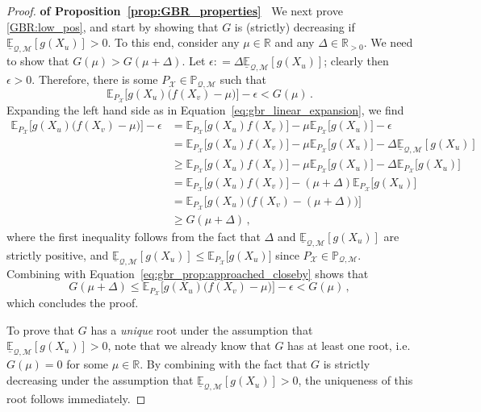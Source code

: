 \documentclass[3p]{elsarticle}
\newcommand{\reals}{\mathbb{R}}
\newcommand{\realspos}{\reals_{>0}}
\newcommand{\states}{\mathcal{X}}
\newcommand{\lexp}{\underline{\mathbb{E}}_{\rateset,\mathcal{M}}}
\newcommand{\rateset}{\mathcal{Q}}
\newcommand{\coloneqq}{:\!=}
\begin{document}
\begin{proof}{\bf of Proposition~\ref{prop:GBR_properties}~}
We next prove \ref{GBR:low_pos}, and start by showing that $G$ is (strictly) decreasing if $\lexp[g(X_u)]>0$. To this end, consider any $\mu\in\reals$ and any $\Delta\in\realspos$. We need to show that $G(\mu)>G(\mu+\Delta)$. Let $\epsilon\coloneqq \Delta \lexp[g(X_u)]$; clearly then $\epsilon>0$. Therefore, there is some $P_\states\in\mathbb{P}_{\rateset,\mathcal{M}}$ such that
\begin{equation}\label{eq:gbr_prop:approached_closeby}
\mathbb{E}_{P_\states}\bigl[g(X_u)\bigl(f(X_v)-\mu\bigr)\bigr] - \epsilon < G(\mu)\,.
\end{equation}
Expanding the left hand side as in Equation~\eqref{eq:gbr_linear_expansion}, we find
\begin{align*}
\mathbb{E}_{P_\states}\bigl[g(X_u)\bigl(f(X_v)-\mu\bigr)\bigr] - \epsilon &= \mathbb{E}_{P_\states}\bigl[g(X_u)f(X_v)\bigr] - \mu \mathbb{E}_{P_\states}\bigl[g(X_u)\bigr] - \epsilon \\
 &= \mathbb{E}_{P_\states}\bigl[g(X_u)f(X_v)\bigr] - \mu \mathbb{E}_{P_\states}\bigl[g(X_u)\bigr] - \Delta\lexp[g(X_u)] \\
 &\geq \mathbb{E}_{P_\states}\bigl[g(X_u)f(X_v)\bigr] - \mu \mathbb{E}_{P_\states}\bigl[g(X_u)\bigr] - \Delta\mathbb{E}_{P_\states}\bigl[g(X_u)\bigr] \\
 &= \mathbb{E}_{P_\states}\bigl[g(X_u)f(X_v)\bigr] - (\mu+\Delta) \mathbb{E}_{P_\states}\bigl[g(X_u)\bigr] \\
 &= \mathbb{E}_{P_\states}\bigl[g(X_u)\bigl(f(X_v)-(\mu+\Delta)\bigr)\bigr] \\
 &\geq G(\mu+\Delta)\,,
\end{align*}
where the first inequality follows from the fact that $\Delta$ and $\lexp[g(X_u)]$ are strictly positive, and $\lexp[g(X_u)]\leq \mathbb{E}_{P_\states}\bigl[g(X_u)\bigr]$ since $P_\states\in\mathbb{P}_{\rateset,\mathcal{M}}$. Combining with Equation~\eqref{eq:gbr_prop:approached_closeby} shows that
\begin{equation*}
G(\mu+\Delta) \leq \mathbb{E}_{P_\states}\bigl[g(X_u)\bigl(f(X_v)-\mu\bigr)\bigr] - \epsilon < G(\mu)\,,
\end{equation*}
which concludes the proof.

To prove that $G$ has a \emph{unique} root under the assumption that $\lexp[g(X_u)]>0$, note that we already know that $G$ has at least one root, i.e. $G(\mu)=0$ for some $\mu\in\reals$. By combining with the fact that $G$ is strictly decreasing under the assumption that $\lexp[g(X_u)]>0$, the uniqueness of this root follows immediately.


\end{proof}
\end{document}

